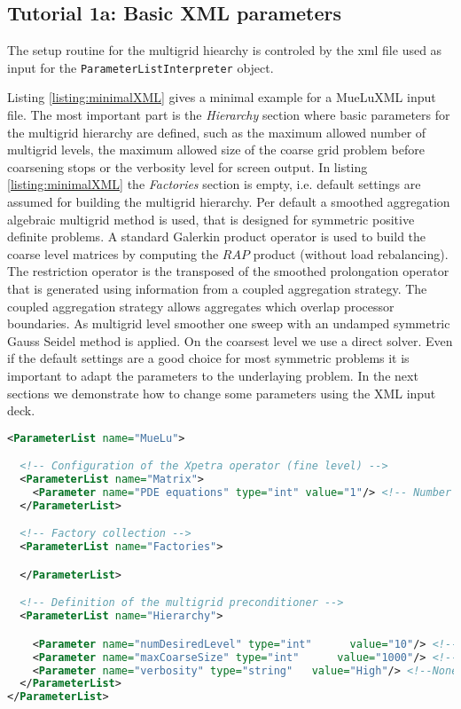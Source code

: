 \documentclass[12pt,a4paper]{article}
\newcommand{\MueLu}{MueLu}
\begin{document}
\subsection{Tutorial 1a: Basic XML parameters}
The setup routine for the multigrid hiearchy is controled by the xml file used as input for the \verb|ParameterListInterpreter| object.

Listing \ref{listing:minimalXML} gives a minimal example for a \MueLu XML input file. The most important part is the \textit{Hierarchy} section where basic parameters for the multigrid hierarchy are defined, such as the maximum allowed number of multigrid levels, the maximum allowed size of the coarse grid problem before coarsening stops or the verbosity level for screen output. In listing \ref{listing:minimalXML} the \textit{Factories} section is empty, i.e. default settings are assumed for building the multigrid hierarchy.
Per default a smoothed aggregation algebraic multigrid method is used, that is designed for symmetric positive definite problems. A standard Galerkin product operator is used to build the coarse level matrices by computing the $RAP$ product (without load rebalancing). The restriction operator is the transposed of the smoothed prolongation operator that is generated using information from a coupled aggregation strategy. The coupled aggregation strategy allows aggregates which overlap processor boundaries. As multigrid level smoother one sweep with an undamped symmetric Gauss Seidel method is applied. On the coarsest level we use a direct solver.
Even if the default settings are a good choice for most symmetric problems it is important to adapt the parameters to the underlaying problem. In the next sections we demonstrate how to change some parameters using the XML input deck.
\begin{Listing} 
\begin{center} 
\begin{lstlisting}[language=XML,label=listing:minimalXML]
<ParameterList name="MueLu">

  <!-- Configuration of the Xpetra operator (fine level) -->
  <ParameterList name="Matrix">
    <Parameter name="PDE equations" type="int" value="1"/> <!-- Number of PDE equations at each grid node.-->
  </ParameterList>

  <!-- Factory collection -->
  <ParameterList name="Factories">

  </ParameterList>

  <!-- Definition of the multigrid preconditioner -->
  <ParameterList name="Hierarchy">

    <Parameter name="numDesiredLevel" type="int"      value="10"/> <!-- Max number of levels -->
    <Parameter name="maxCoarseSize" type="int"      value="1000"/> <!-- Min number of rows on coarsest level -->
    <Parameter name="verbosity" type="string"   value="High"/> <!--None, Low, Medium, High, Extreme -->
  </ParameterList>
</ParameterList>

\end{lstlisting}
\caption{Structure of XML input file for \MueLu} 
\label{listing:minimalXML}
\end{center}
\end{Listing}
\end{document}
